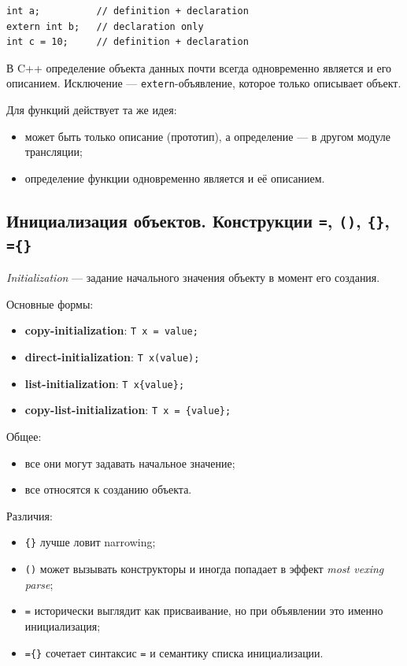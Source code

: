 \begin{example}
\begin{verbatim}
int a;          // definition + declaration
extern int b;   // declaration only
int c = 10;     // definition + declaration
\end{verbatim}
\end{example}

\begin{remark}
В C++ определение объекта данных почти всегда одновременно является и его описанием. Исключение — \texttt{extern}-объявление, которое только описывает объект.
\end{remark}

Для функций действует та же идея:
\begin{itemize}
    \item может быть только описание (прототип), а определение — в другом модуле трансляции;
    \item определение функции одновременно является и её описанием.
\end{itemize}

\subsection{Инициализация объектов. Конструкции \texttt{=}, \texttt{()}, \texttt{\{\}}, \texttt{=\{\}}}
\begin{definition}[Инициализация]
\textit{Initialization} — задание начального значения объекту в момент его создания.
\end{definition}

Основные формы:
\begin{itemize}
    \item \textbf{copy-initialization}: \texttt{T x = value;}
    \item \textbf{direct-initialization}: \texttt{T x(value);}
    \item \textbf{list-initialization}: \texttt{T x\{value\};}
    \item \textbf{copy-list-initialization}: \texttt{T x = \{value\};}
\end{itemize}

Общее:
\begin{itemize}
    \item все они могут задавать начальное значение;
    \item все относятся к созданию объекта.
\end{itemize}

Различия:
\begin{itemize}
    \item \texttt{\{\}} лучше ловит narrowing;
    \item \texttt{()} может вызывать конструкторы и иногда попадает в эффект \textit{most vexing parse};
    \item \texttt{=} исторически выглядит как присваивание, но при объявлении это именно инициализация;
    \item \texttt{=\{\}} сочетает синтаксис \texttt{=} и семантику списка инициализации.
\end{itemize}

